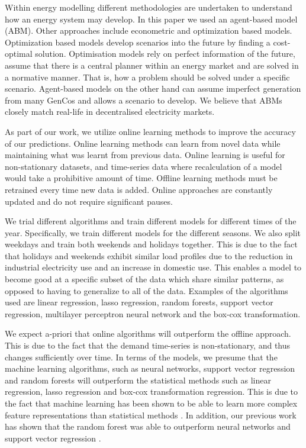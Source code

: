 \documentclass[final,3p,times,twocolumn,numbers]{elsarticle}
\begin{document}
Within energy modelling different methodologies are undertaken to understand how an energy system may develop. In this paper we used an agent-based model (ABM). Other approaches include econometric and optimization based models. Optimization based models develop scenarios into the future by finding a cost-optimal solution. Optimisation models rely on perfect information of the future, assume that there is a central planner within an energy market and are solved in a normative manner. That is, how a problem should be solved under a specific scenario. Agent-based models on the other hand can assume imperfect generation from many GenCos and allows a scenario to develop. We believe that ABMs closely match real-life in decentralised electricity markets. 



As part of our work, we utilize online learning methods to improve the accuracy of our predictions. Online learning methods can learn from novel data while maintaining what was learnt from previous data. Online learning is useful for non-stationary datasets, and time-series data where recalculation of a model would take a prohibitive amount of time. Offline learning methods must be retrained every time new data is added. Online approaches are constantly updated and do not require significant pauses. %

We trial different algorithms and train different models for different times of the year. Specifically, we train different models for the different seasons. We also split weekdays and train both weekends and holidays together. This is due to the fact that holidays and weekends exhibit similar load profiles due to the reduction in industrial electricity use and an increase in domestic use. This enables a model to become good at a specific subset of the data which share similar patterns, as opposed to having to generalize to all of the data. Examples of the algorithms used are linear regression, lasso regression, random forests, support vector regression, multilayer perceptron neural network and the box-cox transformation. 

We expect a-priori that online algorithms will outperform the offline approach. This is due to the fact that the demand time-series is non-stationary, and thus changes sufficiently over time. In terms of the models, we presume that the machine learning algorithms, such as neural networks, support vector regression and random forests will outperform the statistical methods such as linear regression, lasso regression and box-cox transformation regression. This is due to the fact that machine learning has been shown to be able to learn more complex feature representations than statistical methods \cite{Singh2012}. In addition, our previous work has shown that the random forest was able to outperform neural networks and support vector regression \cite{Kell2018}. 
\end{document}
